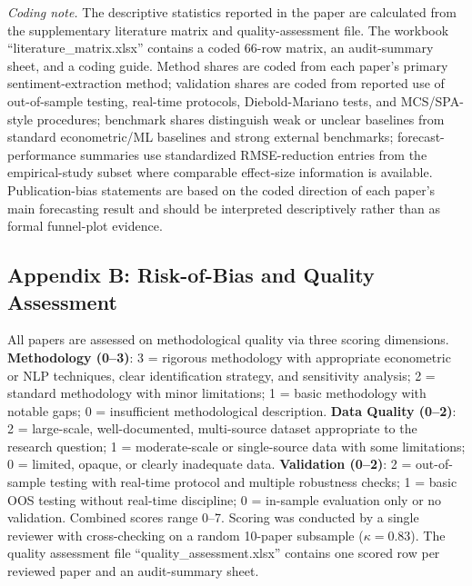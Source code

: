 \documentclass[11pt,twocolumn]{article}
\begin{document}
\noindent\textit{Coding note.} The descriptive statistics reported in the paper are calculated from the supplementary literature matrix and quality-assessment file. The workbook ``literature\_matrix.xlsx'' contains a coded 66-row matrix, an audit-summary sheet, and a coding guide. Method shares are coded from each paper's primary sentiment-extraction method; validation shares are coded from reported use of out-of-sample testing, real-time protocols, Diebold-Mariano tests, and MCS/SPA-style procedures; benchmark shares distinguish weak or unclear baselines from standard econometric/ML baselines and strong external benchmarks; forecast-performance summaries use standardized RMSE-reduction entries from the empirical-study subset where comparable effect-size information is available. Publication-bias statements are based on the coded direction of each paper's main forecasting result and should be interpreted descriptively rather than as formal funnel-plot evidence.

\subsection*{Appendix B: Risk-of-Bias and Quality Assessment}

All papers are assessed on methodological quality via three scoring dimensions. \textbf{Methodology (0--3)}: 3 = rigorous methodology with appropriate econometric or NLP techniques, clear identification strategy, and sensitivity analysis; 2 = standard methodology with minor limitations; 1 = basic methodology with notable gaps; 0 = insufficient methodological description. \textbf{Data Quality (0--2)}: 2 = large-scale, well-documented, multi-source dataset appropriate to the research question; 1 = moderate-scale or single-source data with some limitations; 0 = limited, opaque, or clearly inadequate data. \textbf{Validation (0--2)}: 2 = out-of-sample testing with real-time protocol and multiple robustness checks; 1 = basic OOS testing without real-time discipline; 0 = in-sample evaluation only or no validation. Combined scores range 0--7. Scoring was conducted by a single reviewer with cross-checking on a random 10-paper subsample ($\kappa = 0.83$). The quality assessment file ``quality\_assessment.xlsx'' contains one scored row per reviewed paper and an audit-summary sheet.
\end{document}

